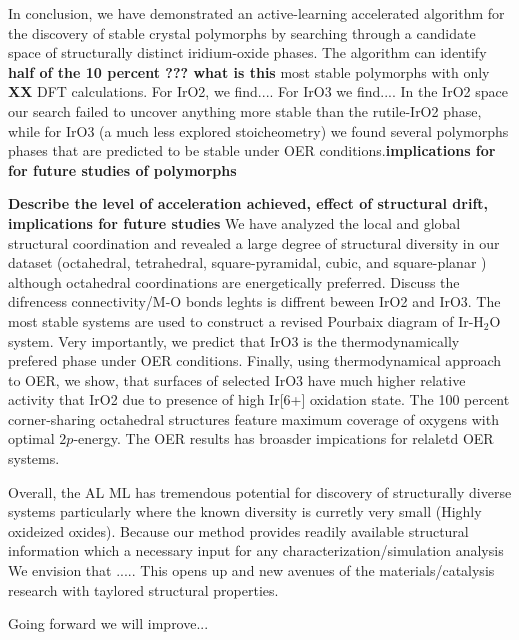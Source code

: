 

%

In conclusion, we have demonstrated an active-learning accelerated algorithm for the discovery of stable crystal polymorphs by searching through a candidate space of structurally distinct iridium-oxide phases.
The algorithm can identify {\bf half of the 10 percent ??? what is this} most stable polymorphs with only {\bf XX} DFT calculations. For IrO2, we find....  For IrO3 we find.... 
In the IrO2 space our search failed to uncover anything more stable than the rutile-IrO2 phase,
while for IrO3 (a much less explored stoicheometry) we found several polymorphs phases that are predicted to be stable under OER conditions.{\bf implications for for future studies of polymorphs}

{\bf Describe the level of acceleration achieved, effect of structural drift, implications for future studies}
We have analyzed the local and global structural coordination and revealed a large degree of structural diversity in our dataset (octahedral, tetrahedral, square-pyramidal, cubic, and square-planar )  
although octahedral coordinations are energetically preferred. Discuss the difrencess  connectivity/M-O bonds leghts is diffrent beween IrO2 and IrO3. 
The most stable systems are used to construct a revised Pourbaix diagram of Ir-H$_2$O system. Very importantly, we predict that IrO3 is the thermodynamically prefered phase under OER conditions. Finally, using thermodynamical approach to OER, we show, 
that surfaces of selected IrO3 have much higher relative activity that IrO2 due to presence of high Ir[6+] oxidation state. The 100 percent corner-sharing octahedral structures feature maximum coverage of oxygens with optimal $2p$-energy. The OER results has broasder impications for relaletd OER systems.

Overall, the AL ML has tremendous potential for discovery of structurally diverse systems particularly where the known diversity is curretly very small (Highly oxideized oxides). Because our method provides readily available structural information which a necessary input for any characterization/simulation analysis
We envision that ..... 
This opens up and new avenues of the materials/catalysis research with taylored structural properties. 


Going forward we will improve...



